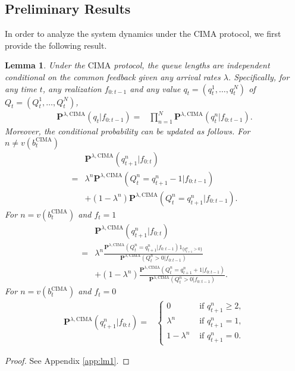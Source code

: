 \documentclass[onecolumn,draftcls]{IEEEtran}
\newtheorem{lemma}{Lemma}
\newcommand{\g}{\text{CIMA}}
\begin{document}
\subsection{Preliminary Results}
In order to analyze the system dynamics under the $\g$ protocol, we first provide the following result.
\begin{lemma}
\label{lm:conditional_indep}
Under the $\g$ protocol,
the queue lengths are independent conditional on the common feedback given any arrival rates $\lambda$.
Specifically, for any time $t$, any realization $f_{0:t-1}$ and any value $q_t = (q^1_t,\dots,q^N_t)$ of $Q_t = (Q^1_t,\dots,Q^N_t)$,
\begin{align}
\mathbf{P}^{\lambda,\g}(q_t|f_{0:t-1})
= & \prod_{n=1}^N \mathbf{P}^{\lambda,\g}(q^n_t|f_{0:t-1}).
\label{eq:conditional_indep}
\end{align}
Moreover, the conditional probability can be updated as follows.
For $n\neq v(b^{\g}_t)$
\begin{align}
&\mathbf{P}^{\lambda,\g}(q^n_{t+1}|f_{0:t})
\nonumber\\
=&\lambda^n\mathbf{P}^{\lambda,\g}(Q^n_t = q^n_{t+1}-1|f_{0:t-1})\nonumber\\
&+(1-\lambda^n)\mathbf{P}^{\lambda,\g}(Q^n_t = q^n_{t+1}|f_{0:t-1}).
\label{eq:conditional_update1}
\end{align}
For $n =  v(b^{\g}_t)$ and $f_t = 1$
\begin{align}
&\mathbf{P}^{\lambda,\g}(q^n_{t+1}|f_{0:t})
\nonumber\\
=&\lambda^n
\frac{\mathbf{P}^{\lambda,\g}(Q^n_t=q^n_{t+1}|f_{0:t-1})1_{\{q^n_{t+1}>0\}}}{\mathbf{P}^{\lambda,\g}(Q^n_t >0|f_{0:t-1})}
\nonumber\\
&+(1-\lambda^n)
\frac{\mathbf{P}^{\lambda,\g}(Q^n_t=q^n_{t+1}+1|f_{0:t-1})}{\mathbf{P}^{\lambda,\g}(Q^n_t >0|f_{0:t-1})}.
\label{eq:conditional_update2}
\end{align}
For $n =  v(b^{\g}_t)$ and $f_t = 0$
\begin{align}
\mathbf{P}^{\lambda,\g}(q^n_{t+1}|f_{0:t})
=& \left\{ \begin{array}{ll}
0 & \text{ if }q^n_{t+1} \geq 2, \\
\lambda^n & \text{ if }q^n_{t+1} =1, \\
1-\lambda^n & \text{ if }q^n_{t+1} =0.
\end{array}\right.
\label{eq:conditional_update3}
\end{align}


\end{lemma}
\begin{proof}
See Appendix \ref{app:lm1}.
\end{proof}
\end{document}
